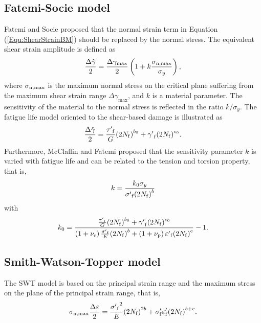 \subsection{Fatemi-Socie model}
\noindent
Fatemi and Socie \cite{Fatemi1988} proposed that the normal strain term in Equation (\ref{Equ:ShearStrainBM}) should be replaced by the normal stress.
The equivalent shear strain amplitude is defined as
\begin{equation}
\frac{{\Delta \hat \gamma }}{2} = \frac{{\Delta {\gamma _{\max }}}}{2}\left( {1 + k\frac{{{\sigma _{\rm n,\max}}}}{{{\sigma _y}}}} \right),
\end{equation}
where
$\sigma _{\rm n,\max}$ is the maximum normal stress on the critical plane suffering from the maximum shear strain range $\Delta {\gamma _{\max}}$, and $k$ is a material parameter. The sensitivity of the material to the normal stress is reflected in the ratio $k/\sigma_y$.
The fatigue life model oriented to the shear-based damage is illustrated as
\begin{equation}
\frac{{\Delta \hat \gamma }}{2} = \frac{{{{\tau '}_{\rm f}}}}{G}{\left( {2{N_{\rm f}}} \right)^{{b_0}}} + {{\gamma '}_{\rm f}}{\left( {2{N_{\rm f}}} \right)^{{c_0}}}.
\label{Equ:FS_model}
\end{equation}
Furthermore, McClaflin and Fatemi \cite{McClaflin2004} proposed that the sensitivity parameter $k$ is varied with fatigue life and can be related to the tension and torsion property, that is,
\begin{equation}
k =  \frac{{k_0 {\sigma _y}}}{{{{\sigma '}_{\rm f}}{{\left( {2{N_{\rm f}}} \right)}^b}}}
\label{Equ:k_in_FS_model}
\end{equation}
with
\[
k_0 =  {\frac{{\frac{{{{\tau '}_{\rm f}}}}{G}{{\left( {2{N_{\rm f}}} \right)}^{{b_0}}} + {{\gamma '}_{\rm f}}{{\left( {2{N_{\rm f}}} \right)}^{{c_0}}}}}{{\left( {1 + {\nu _{\rm e}}} \right)\frac{{{{\sigma '}_{\rm f}}}}{E}{{\left( {2{N_{\rm f}}} \right)}^b} + \left( {1 + {\nu _{\rm p}}} \right){{\varepsilon '}_{\rm f}}{{\left( {2{N_{\rm f}}} \right)}^c}}} - 1} .
\]


\subsection{Smith-Watson-Topper model}
\noindent
The SWT model \cite{Socie2000} is based on the principal strain range and the maximum stress on the plane of the principal
strain range, that is,
\begin{equation}
{\sigma _{\rm n, \max}}\frac{{\Delta \varepsilon }}{2} = \frac{{{{\sigma '}_{\rm f}}^2}}{E}{\left( {2{N_{\rm f}}} \right)^{2b}} + {\sigma '_{\rm f}}{\varepsilon '_{\rm f}}{\left( {2{N_{\rm f}}} \right)^{b + c}}.
\label{Equ:SWT_model}
\end{equation}


